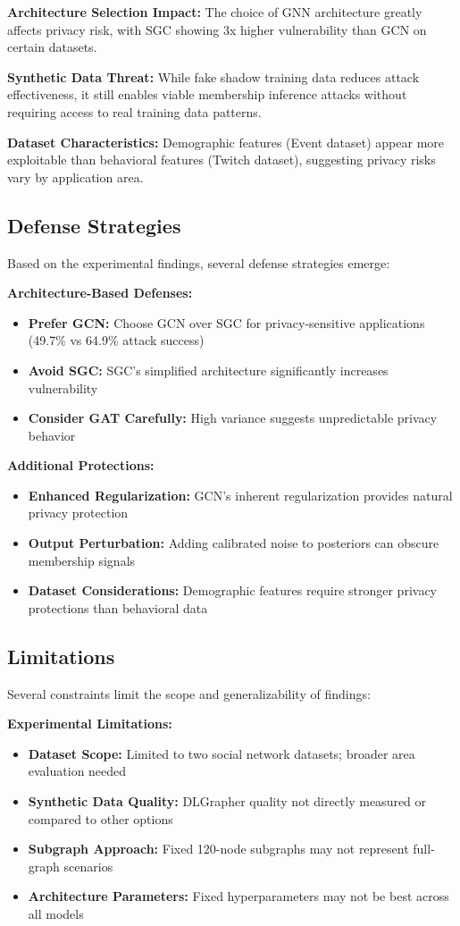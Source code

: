 \documentclass{article}
\begin{document}
\textbf{Architecture Selection Impact:} The choice of GNN architecture greatly affects privacy risk, with SGC showing 3x higher vulnerability than GCN on certain datasets.

\textbf{Synthetic Data Threat:} While fake shadow training data reduces attack effectiveness, it still enables viable membership inference attacks without requiring access to real training data patterns.

\textbf{Dataset Characteristics:} Demographic features (Event dataset) appear more exploitable than behavioral features (Twitch dataset), suggesting privacy risks vary by application area.

\subsection{Defense Strategies}
Based on the experimental findings, several defense strategies emerge:

\textbf{Architecture-Based Defenses:}
\begin{itemize}
\item \textbf{Prefer GCN:} Choose GCN over SGC for privacy-sensitive applications (49.7\% vs 64.9\% attack success)
\item \textbf{Avoid SGC:} SGC's simplified architecture significantly increases vulnerability
\item \textbf{Consider GAT Carefully:} High variance suggests unpredictable privacy behavior
\end{itemize}

\textbf{Additional Protections:}
\begin{itemize}
\item \textbf{Enhanced Regularization:} GCN's inherent regularization provides natural privacy protection
\item \textbf{Output Perturbation:} Adding calibrated noise to posteriors can obscure membership signals \cite{jayaraman2019evaluating}
\item \textbf{Dataset Considerations:} Demographic features require stronger privacy protections than behavioral data
\end{itemize}

\subsection{Limitations}
Several constraints limit the scope and generalizability of findings:

\textbf{Experimental Limitations:}
\begin{itemize}
\item \textbf{Dataset Scope:} Limited to two social network datasets; broader area evaluation needed
\item \textbf{Synthetic Data Quality:} DLGrapher quality not directly measured or compared to other options
\item \textbf{Subgraph Approach:} Fixed 120-node subgraphs may not represent full-graph scenarios
\item \textbf{Architecture Parameters:} Fixed hyperparameters may not be best across all models
\end{itemize}
\end{document}
